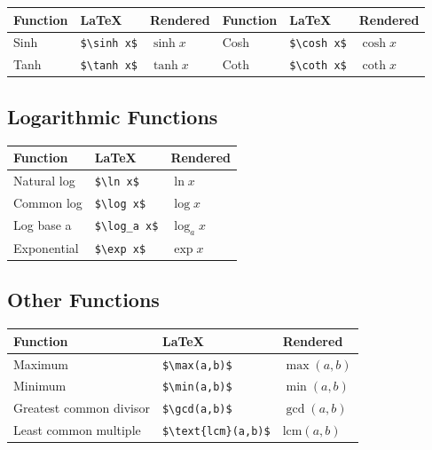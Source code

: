 \documentclass[
  letterpaper,
  DIV=11,
  numbers=noendperiod]{scrartcl}
\begin{document}
\begin{longtable}[]{@{}llllll@{}}
\toprule()
Function & LaTeX & Rendered & Function & LaTeX & Rendered \\
\midrule()
\endhead
Sinh & \texttt{\$\textbackslash{}sinh\ x\$} & \(\sinh x\) & Cosh &
\texttt{\$\textbackslash{}cosh\ x\$} & \(\cosh x\) \\
Tanh & \texttt{\$\textbackslash{}tanh\ x\$} & \(\tanh x\) & Coth &
\texttt{\$\textbackslash{}coth\ x\$} & \(\coth x\) \\
\bottomrule()
\end{longtable}

\hypertarget{logarithmic-functions}{%
\subsection{Logarithmic Functions}\label{logarithmic-functions}}

\begin{longtable}[]{@{}lll@{}}
\toprule()
Function & LaTeX & Rendered \\
\midrule()
\endhead
Natural log & \texttt{\$\textbackslash{}ln\ x\$} & \(\ln x\) \\
Common log & \texttt{\$\textbackslash{}log\ x\$} & \(\log x\) \\
Log base a & \texttt{\$\textbackslash{}log\_a\ x\$} & \(\log_a x\) \\
Exponential & \texttt{\$\textbackslash{}exp\ x\$} & \(\exp x\) \\
\bottomrule()
\end{longtable}

\hypertarget{other-functions}{%
\subsection{Other Functions}\label{other-functions}}

\begin{longtable}[]{@{}lll@{}}
\toprule()
Function & LaTeX & Rendered \\
\midrule()
\endhead
Maximum & \texttt{\$\textbackslash{}max(a,b)\$} & \(\max(a,b)\) \\
Minimum & \texttt{\$\textbackslash{}min(a,b)\$} & \(\min(a,b)\) \\
Greatest common divisor & \texttt{\$\textbackslash{}gcd(a,b)\$} &
\(\gcd(a,b)\) \\
Least common multiple & \texttt{\$\textbackslash{}text\{lcm\}(a,b)\$} &
\(\text{lcm}(a,b)\) \\
\bottomrule()
\end{longtable}
\end{document}
